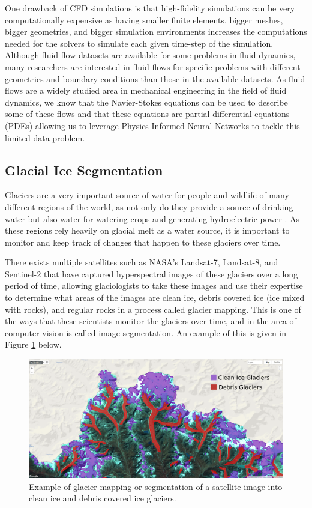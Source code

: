One drawback of CFD simulations is that high-fidelity simulations can be very computationally expensive as having smaller finite elements, bigger meshes, bigger geometries, and bigger simulation environments increases the computations needed for the solvers to simulate each given time-step of the simulation. Although fluid flow datasets are available for some problems in fluid dynamics, many researchers are interested in fluid flows for specific problems with different geometries and boundary conditions than those in the available datasets. As fluid flows are a widely studied area in mechanical engineering in the field of fluid dynamics, we know that the Navier-Stokes equations can be used to describe some of these flows and that these equations are partial differential equations (PDEs) allowing us to leverage Physics-Informed Neural Networks \cite{PINNS} to tackle this limited data problem.

\subsection{Glacial Ice Segmentation}
Glaciers are a very important source of water for people and wildlife of many different regions of the world, as not only do they provide a source of drinking water but also water for watering crops and generating hydroelectric power \cite{GlacierImportance}. As these regions rely heavily on glacial melt as a water source, it is important to monitor and keep track of changes that happen to these glaciers over time. 

There exists multiple satellites such as NASA's Landsat-7, Landsat-8, and Sentinel-2 that have captured hyperspectral images of these glaciers over a long period of time, allowing glaciologists to take these images and use their expertise to determine what areas of the images are clean ice, debris covered ice (ice mixed with rocks), and regular rocks in a process called glacier mapping. This is one of the ways that these scientists monitor the glaciers over time, and in the area of computer vision is called image segmentation. An example of this is given in Figure \ref{fig:glacier_mapping} below.

\begin{figure}[H] \centering
    \includegraphics[width=\linewidth]{figures/glacier_mapping.png}
    \caption{Example of glacier mapping or segmentation of a satellite image into clean ice and debris covered ice glaciers.}
    \label{fig:glacier_mapping}
\end{figure}

